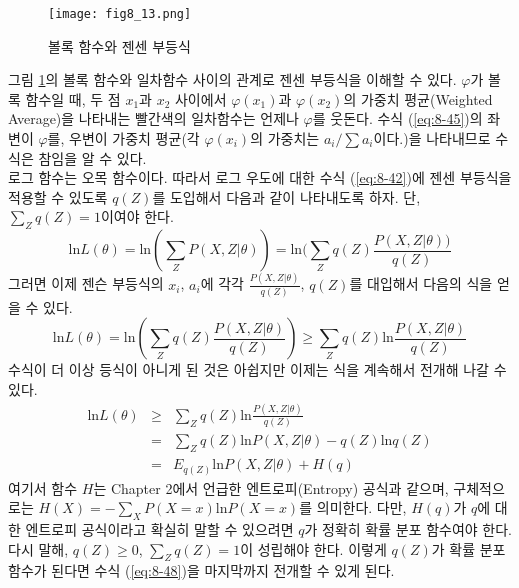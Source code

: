 \documentclass[a4paper]{oblivoir}
\begin{document}
\begin{figure}[ht] \centering 
\texttt{[image: fig8\_13.png]} 
\caption{볼록 함수와 젠센 부등식}
\label{fig:8-13}
\end{figure}

그림 \ref{fig:8-13}의 볼록 함수와 일차함수 사이의 관계로 젠센 부등식을 이해할 수 있다. $\varphi$가 볼록 함수일 때, 두 점 $x_1$과 $x_2$ 사이에서  $\varphi(x_1)$과 $\varphi(x_2)$의 가중치 평균(Weighted Average)을 나타내는 빨간색의 일차함수는 언제나 $\varphi$를 웃돈다. 수식 (\ref{eq:8-45})의 좌변이 $\varphi$를, 우변이 가중치 평균(각 $\varphi(x_{i})$의 가중치는 $a_{i}/\sum a_{i}$이다.)을 나타내므로 수식은 참임을 알 수 있다.  \\     

로그 함수는 오목 함수이다. 따라서 로그 우도에 대한 수식 (\ref{eq:8-42})에 젠센 부등식을 적용할 수 있도록 $q(Z)$를 도입해서 다음과 같이 나타내도록 하자. 단, $\sum_{Z} q(Z)=1$이여야 한다.  
\begin{equation}
\textrm{ln} L(\theta) =  \textrm{ln} (\sum_{Z} P(X, Z|\theta)) = \textrm{ln} (\sum_{Z} q(Z) \frac{P(X, Z|\theta))}{q(Z)} \label{eq:8-46}
\end{equation}
그러면 이제 젠슨 부등식의 $x_i$, $a_i$에 각각 $\frac{P(X, Z|\theta)}{q(Z)}$, $q(Z)$를 대입해서 다음의 식을 얻을 수 있다. 
\begin{equation}
\textrm{ln} L(\theta) =  \textrm{ln} (\sum_{Z} q(Z) \frac{P(X, Z|\theta)}{q(Z)}) \geq \sum_{Z} q(Z) \textrm{ln} \frac{P(X, Z|\theta)}{q(Z)} \label{eq:8-47}
\end{equation}
수식이 더 이상 등식이 아니게 된 것은 아쉽지만 이제는 식을 계속해서 전개해 나갈 수 있다.  
\begin{eqnarray}
\textrm{ln} L(\theta) & \geq & \sum_{Z} q(Z) \textrm{ln} \frac{P(X, Z|\theta)}{q(Z)} \nonumber  \\
& = & \sum_{Z} q(Z) \textrm{ln} P(X, Z|\theta) - q(Z) \textrm{ln} q(Z) \nonumber  \\
& = & E_{q(Z)} \textrm{ln} P(X, Z|\theta) + H(q)  \label{eq:8-48} 
\end{eqnarray}
여기서 함수 $H$는 Chapter 2에서 언급한 엔트로피(Entropy) 공식과 같으며, 구체적으로는 $H(X) = -\sum_{X} P(X=x) \textrm{ln} P(X=x)$를 의미한다. 다만, $H(q)$가 $q$에 대한 엔트로피 공식이라고 확실히 말할 수 있으려면 $q$가 정확히 확률 분포 함수여야 한다. 다시 말해, $q(Z) \geq 0$, $\sum_{Z} q(Z)=1$이 성립해야 한다. 이렇게 $q(Z)$가 확률 분포 함수가 된다면  수식 (\ref{eq:8-48})을 마지막까지 전개할 수 있게 된다. \\
\end{document}
